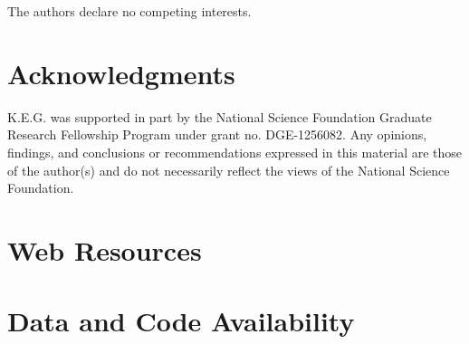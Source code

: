 \documentclass[12pt]{article}
\newcommand{\edit}[1]{{\color{red}{#1}}}
\begin{document}
The authors declare no competing interests.


\section*{Acknowledgments}


K.E.G. was supported in part by the National Science Foundation Graduate Research Fellowship Program under grant no. DGE-1256082. Any opinions, findings, and conclusions or recommendations expressed in this material are those of the author(s) and do not necessarily reflect the views of the National Science Foundation.



\section*{Web Resources}


\edit{GitHub Repository: lists of regions to exclude, code for LD pruning, excluding, and plotting loadings}


\section*{Data and Code Availability}


\end{document}

